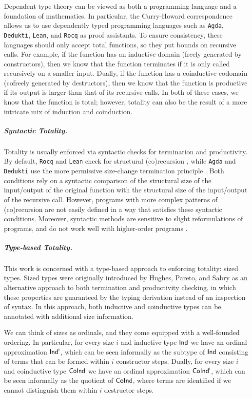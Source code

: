 Dependent type theory can be viewed as both a programming language and a foundation of mathematics.
In particular, the Curry-Howard correspondence allows us to use dependently typed programming languages such as \texttt{Agda}, \texttt{Dedukti}, \texttt{Lean}, and \texttt{Rocq} as proof assistants.
To ensure consistency, these languages should only accept total functions, so they put bounds on recursive calls.
For example, if the function has an inductive domain (freely generated by constructors), then we know that the function terminates if it is only called recursively on a smaller input.
Dually, if the function has a coinductive codomain (cofreely generated by destructors), then we know that the function is productive if its output is larger than that of its recursive calls.
In both of these cases, we know that the function is total; however, totality can also be the result of a more intricate mix of induction and coinduction.

\subparagraph{Syntactic Totality.}
Totality is usually enforced via syntactic checks for termination and productivity.
By default, \texttt{Rocq} and \texttt{Lean} check for structural (co)recursion \cite{goguen_eliminating_2006,cockx_eliminating_2016,thibodeau_intensional_2020}, while \texttt{Agda} and \texttt{Dedukti} use the more permissive size-change termination principle \cite{size-change}.
Both conditions rely on a syntactic comparison of the structural size of the input/output of the original function with the structural size of the input/output of the recursive call. 
However, programs with more complex patterns of (co)recursion are not easily defined in a way that satisfies these syntactic conditions.
Moreover, syntactic methods are sensitive to slight reformulations of programs, and do not work well with higher-order programs \cite{Abel-inflationary}.

\subparagraph{Type-based Totality.}
This work is concerned with a type-based approach to enforcing totality: sized types.
Sized types were originally introduced by Hughes, Pareto, and Sabry \cite{hughes} as an alternative approach to both termination and productivity checking, in which these properties are guaranteed by the typing derivation instead of an inspection of syntax.
In this approach, both inductive and coinductive types can be annotated with additional size information.

We can think of sizes as ordinals, and they come equipped with a well-founded ordering.
In particular, for every size \(i\) and inductive type \(\sf{Ind}\) we have an ordinal approximation \(\sf{Ind}^i\), which can be seen informally as the subtype of \(\sf{Ind}\) consisting of terms that can be formed within \(i\) constructor steps.
Dually, for every size \(i\) and coinductive type \(\sf{CoInd}\) we have an ordinal approximation \(\sf{CoInd}^i\), which can be seen informally as the quotient of \(\sf{CoInd}\), where terms are identified if we cannot distinguish them within \(i\) destructor steps.

